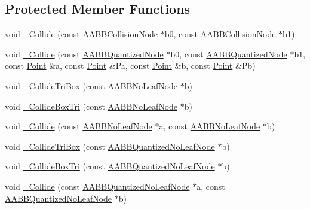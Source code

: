 \subsection*{Protected Member Functions}
\begin{DoxyCompactItemize}
\item 
void \hyperlink{classOpcode_1_1AABBTreeCollider_acd61a409f03743eba0423f7a341a01fb}{\+\_\+\+Collide} (const \hyperlink{classOpcode_1_1AABBCollisionNode}{A\+A\+B\+B\+Collision\+Node} $\ast$b0, const \hyperlink{classOpcode_1_1AABBCollisionNode}{A\+A\+B\+B\+Collision\+Node} $\ast$b1)
\item 
void \hyperlink{classOpcode_1_1AABBTreeCollider_acf3599e2543d75be61e985d2be02385f}{\+\_\+\+Collide} (const \hyperlink{classOpcode_1_1AABBQuantizedNode}{A\+A\+B\+B\+Quantized\+Node} $\ast$b0, const \hyperlink{classOpcode_1_1AABBQuantizedNode}{A\+A\+B\+B\+Quantized\+Node} $\ast$b1, const \hyperlink{classOpcode_1_1Point}{Point} \&a, const \hyperlink{classOpcode_1_1Point}{Point} \&Pa, const \hyperlink{classOpcode_1_1Point}{Point} \&b, const \hyperlink{classOpcode_1_1Point}{Point} \&Pb)
\item 
void \hyperlink{classOpcode_1_1AABBTreeCollider_ac472301f03796767728a8b2debe3cb77}{\+\_\+\+Collide\+Tri\+Box} (const \hyperlink{classOpcode_1_1AABBNoLeafNode}{A\+A\+B\+B\+No\+Leaf\+Node} $\ast$b)
\item 
void \hyperlink{classOpcode_1_1AABBTreeCollider_ab3b86e653052018c0f6e8b77a0e287ec}{\+\_\+\+Collide\+Box\+Tri} (const \hyperlink{classOpcode_1_1AABBNoLeafNode}{A\+A\+B\+B\+No\+Leaf\+Node} $\ast$b)
\item 
void \hyperlink{classOpcode_1_1AABBTreeCollider_a8791691a59e7b295b7954d4296cba6be}{\+\_\+\+Collide} (const \hyperlink{classOpcode_1_1AABBNoLeafNode}{A\+A\+B\+B\+No\+Leaf\+Node} $\ast$a, const \hyperlink{classOpcode_1_1AABBNoLeafNode}{A\+A\+B\+B\+No\+Leaf\+Node} $\ast$b)
\item 
void \hyperlink{classOpcode_1_1AABBTreeCollider_a980e360e4ddcfbc5333f1e7d0cb92787}{\+\_\+\+Collide\+Tri\+Box} (const \hyperlink{classOpcode_1_1AABBQuantizedNoLeafNode}{A\+A\+B\+B\+Quantized\+No\+Leaf\+Node} $\ast$b)
\item 
void \hyperlink{classOpcode_1_1AABBTreeCollider_a986b84d848d5125b5314fb431583d9f2}{\+\_\+\+Collide\+Box\+Tri} (const \hyperlink{classOpcode_1_1AABBQuantizedNoLeafNode}{A\+A\+B\+B\+Quantized\+No\+Leaf\+Node} $\ast$b)
\item 
void \hyperlink{classOpcode_1_1AABBTreeCollider_a440c924079dab66e021367be7a52a84b}{\+\_\+\+Collide} (const \hyperlink{classOpcode_1_1AABBQuantizedNoLeafNode}{A\+A\+B\+B\+Quantized\+No\+Leaf\+Node} $\ast$a, const \hyperlink{classOpcode_1_1AABBQuantizedNoLeafNode}{A\+A\+B\+B\+Quantized\+No\+Leaf\+Node} $\ast$b)

\end{DoxyCompactItemize}
